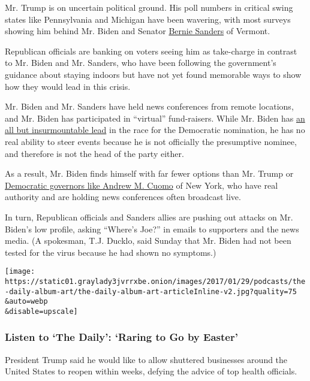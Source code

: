 Mr. Trump is on uncertain political ground. His poll numbers in critical
swing states like Pennsylvania and Michigan have been wavering, with
most surveys showing him behind Mr. Biden and Senator
\href{https://www.nytimes3xbfgragh.onion/interactive/2020/us/elections/bernie-sanders.html}{Bernie
Sanders} of Vermont.

Republican officials are banking on voters seeing him as take-charge in
contrast to Mr. Biden and Mr. Sanders, who have been following the
government's guidance about staying indoors but have not yet found
memorable ways to show how they would lead in this crisis.

Mr. Biden and Mr. Sanders have held news conferences from remote
locations, and Mr. Biden has participated in ``virtual'' fund-raisers.
While Mr. Biden has
\href{https://www.nytimes3xbfgragh.onion/interactive/2020/us/elections/delegate-count-primary-results.html}{an
all but insurmountable lead} in the race for the Democratic nomination,
he has no real ability to steer events because he is not officially the
presumptive nominee, and therefore is not the head of the party either.

As a result, Mr. Biden finds himself with far fewer options than Mr.
Trump or
\href{https://www.nytimes3xbfgragh.onion/2020/03/17/us/politics/governors-coronavirus-trump.html}{Democratic
governors like Andrew M. Cuomo} of New York, who have real authority and
are holding news conferences often broadcast live.

In turn, Republican officials and Sanders allies are pushing out attacks
on Mr. Biden's low profile, asking ``Where's Joe?'' in emails to
supporters and the news media. (A spokesman, T.J. Ducklo, said Sunday
that Mr. Biden had not been tested for the virus because he had shown no
symptoms.)

\texttt{[image: https://static01.graylady3jvrrxbe.onion/images/2017/01/29/podcasts/the-daily-album-art/the-daily-album-art-articleInline-v2.jpg?quality=75\\\&auto=webp\\\&disable=upscale]}

\hypertarget{listen-to-the-daily-raring-to-go-by-easter}{%
\subsubsection{Listen to `The Daily': `Raring to Go by
Easter'}\label{listen-to-the-daily-raring-to-go-by-easter}}

President Trump said he would like to allow shuttered businesses around
the United States to reopen within weeks, defying the advice of top
health officials.

